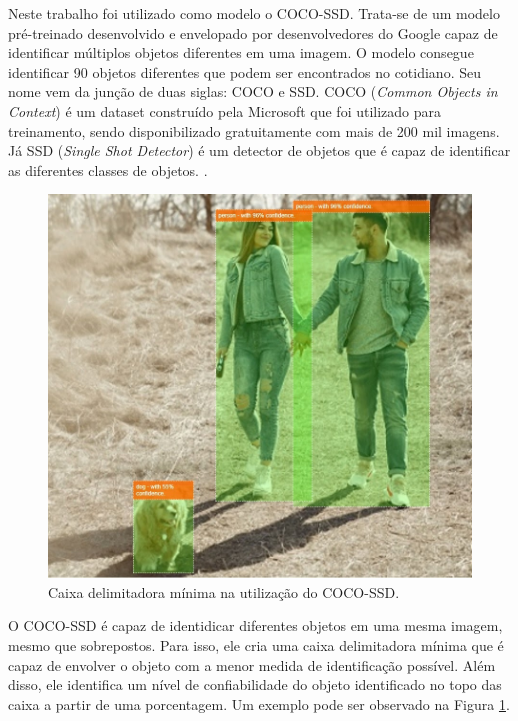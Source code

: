 Neste trabalho foi utilizado como modelo o COCO-SSD. Trata-se de um modelo pré-treinado desenvolvido e envelopado por desenvolvedores do Google capaz de identificar múltiplos objetos diferentes em uma imagem. O modelo consegue identificar 90 objetos diferentes \cite{noauthor_pre-trained_2021} que podem ser encontrados no cotidiano. Seu nome vem da junção de duas siglas: COCO e SSD. COCO (\textit{Common Objects in Context}) é um dataset construído pela Microsoft que foi utilizado para treinamento, sendo disponibilizado gratuitamente com mais de 200 mil imagens. Já SSD (\textit{Single Shot Detector}) é um detector de objetos que é capaz de identificar as diferentes classes de objetos. \cite{forson_understanding_2019}.

\begin{figure}[b!]
\centering
\includegraphics[width=0.7\columnwidth]{Imagens/BoundaryBox.jpeg}
\caption{Caixa delimitadora mínima na utilização do COCO-SSD. \cite{mayes_make_2021}}
\label{fig:cocossd}
\end{figure}

O COCO-SSD é capaz de identidicar diferentes objetos em uma mesma imagem, mesmo que sobrepostos. Para isso, ele cria uma caixa delimitadora mínima que é capaz de envolver o objeto com a menor medida de identificação possível. Além disso, ele identifica um nível de confiabilidade do objeto identificado no topo das caixa a partir de uma porcentagem. Um exemplo pode ser observado na Figura \ref{fig:cocossd}.


